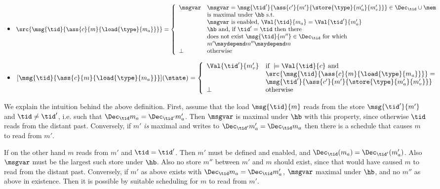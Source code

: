 \begin{itemize}
\item $
\src{\msg{\tid}{\ass{c}{m}{\load{\type}{m_a}}}} =
    \left \{
      \begin{array}{ll}
        \msgvar & \msgvar = \msg{\tid'}{\ass{c'}{m'}{\store{\type}{m_a'}{m_v'}}}
                  \in\Dec_{\tid}\cup\mem \\
                & \mbox{is maximal under }\hb\mbox{ s.t. } \\
                & \msgvar\mbox{ is enabled, }\Val{\tid}{m_a}=\Val{\tid'}{m_a'} \\
                & \hb\mbox{ and, if }\tid'=\tid \mbox{ then there} \\
                & \mbox{does not exist }\msg{\tid}{m''}\in\Dec_{\tid} \mbox{ for which } \\
                & m'\maydepend m''\maydepend m \\
        \perp & \mbox{otherwise}
      \end{array}
    \right.
    $
\item $
[\msg{\tid}{\ass{c}{m}{\load{\type}{m_a}}}](\state)  = 
    \left \{
      \begin{array}{ll}
        \Val{\tid'}{m_v'} & \mbox{if }\models\Val{\tid}{c}\mbox{ and } \\
                   & \src{\msg{\tid}{\ass{c}{m}{\load{\type}{m_a}}}} = \\
                   &  \msg{\tid'}{\ass{c'}{m'}{\store{\type}{m_a'}{m_v'}}} \\
        \perp & \mbox{otherwise}
      \end{array}
    \right.
    $
\end{itemize}

We explain the intuition behind the above definition. First, assume that the load $\msg{\tid}{m}$ reads from the store $\msg{\tid'}{m'}$ and $\tid\neq \tid'$,
i.e. such that $\Dec_{\tid}{m_a} = \Dec_{\tid'}{m_a'}$. Then $\msgvar$ is maximal under $\hb$ with this property, since otherwise $\tid$ reads from the distant past. Conversely, if $m'$ \emph{is} maximal and writes to $\Dec_{\tid'}{m_a'}=\Dec_{\tid}{m_a}$ then there is a schedule that causes $m$ to read from $m'$.

If on the other hand $m$ reads from $m'$ and $\tid = \tid'$. Then $m'$ must be
defined and enabled, and $\Dec_{\tid}(m_a) = \Dec_{\tid'}(m_a')$. Also $\msgvar$ must be the largest such store under $\hb$. Also no store $m''$ between $m'$ and $m$ should exist, since that would have caused $m$ to read from the distant past. Conversely, if $m'$ as above exists with $\Dec_{\tid}{m_a}=\Dec_{\tid}{m_a'}$,
$\msgvar$ maximal under $\hb$, and no $m''$ as above in existence. Then it is possible by suitable scheduling for $m$ to read from $m'$.

